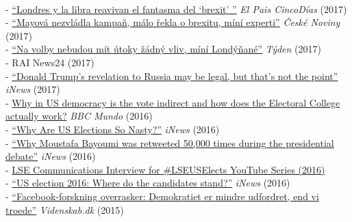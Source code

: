 \documentclass[12pt]{article}
\newcommand{\topic}[1]{\pagebreak[3]\indent {\color{lg}{\footnotesize #1 }}\\}
\newcommand{\subentry}[1]{{\color{lg}-} #1\vspace{.25em}\\}
\begin{document}
	\topic{Media Coverage and Interviews}
		\subentry{\href{https://cincodias.elpais.com/cincodias/2017/06/07/mercados/1496862592_391146.html}{``Londres y la libra reavivan el fantasma del `brexit' ''} \textit{El Pais CincoD\'{i}as} (2017)}
        \subentry{\href{http://www.ceskenoviny.cz/zpravy/mayova-nezvladla-kampan-malo-rekla-o-brexitu-mini-experti/1494511}{``Mayov\'{a} nezvl\'{a}dla kampa\v{n}, m\'{a}lo \v{r}ekla o brexitu, m\'{i}n\'{i} experti''} \textit{\v{C}esk\'{e} Noviny} (2017)}
        \subentry{\href{http://www.tyden.cz/rubriky/zahranici/evropa/na-volby-nebudou-mit-utoky-zadny-vliv-mini-londynane_433320.html}{``Na volby nebudou m\'{i}t \'{u}toky \v{z}\'{a}dn\'{y} vliv, m\'{i}n\'{i} Lond\'{y}\v{n}an\'{e}''} \textit{T\'{y}den} (2017)}
		\subentry{RAI News24 (2017)}
        \subentry{\href{https://inews.co.uk/essentials/news/world/donald-trumps-revelations-russia-may-legal-thats-not-point/}{``Donald Trump's revelation to Russia may be legal, but that's not the point''} \textit{iNews} (2017)}
        \subentry{\href{http://www.bbc.com/mundo/noticias-internacional-37701880}{Why in US democracy is the vote indirect and how does the Electoral College actually work?} \textit{BBC Mundo} (2016)}
		\subentry{\href{https://inews.co.uk/essentials/news/world/us-elections-nasty/}{``Why Are US Elections So Nasty?''} \textit{iNews} (2016)}
		\subentry{\href{https://inews.co.uk/essentials/news/world/moustafa-bayoumi-retweeted-50000-presidential-debate/}{``Why Moustafa Bayoumi was retweeted 50,000 times during the presidential debate''} \textit{iNews} (2016)}
		\subentry{\href{https://www.youtube.com/watch?v=Hwm5V6H_qog&list=PLK4elntcUEy1a8P47lFQDg1oHoNq1BdYk&index=20}{LSE Communications Interview for \#LSEUSElects YouTube Series (2016)}}
		\subentry{\href{https://inews.co.uk/explainers/iq/candidates-stand-us-election-2016/}{``US election 2016: Where do the candidates stand?''} \textit{iNews} (2016)}
		\subentry{\href{http://videnskab.dk/kultur-samfund/facebook-forskning-overrasker-demokratiet-er-mindre-udfordret-end-vi-troede}{``Facebook-forskning overrasker: Demokratiet er mindre udfordret, end vi troede''} \textit{Videnskab.dk} (2015)}
	
\end{document}

